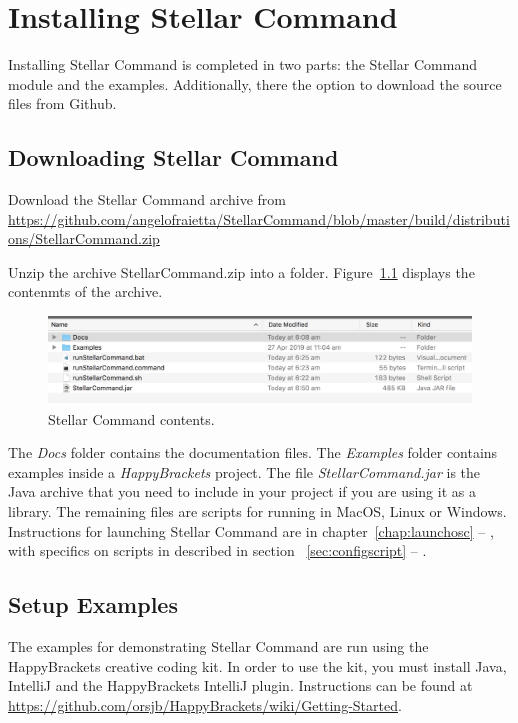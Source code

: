 \chapter{Installing Stellar Command} \label{chap:install}
Installing Stellar Command is completed in two parts: the Stellar Command module and the examples. Additionally, there the option to download the source files from Github.
\section{Downloading Stellar Command}
Download the Stellar Command archive from \url{https://github.com/angelofraietta/StellarCommand/blob/master/build/distributions/StellarCommand.zip}

Unzip the archive StellarCommand.zip into a folder. Figure~\ref{fig:zipcontents} displays the contenmts of the archive. 

\begin{figure}[htbp]
	\centering
	\includegraphics[width=1\columnwidth]{zipcontents}
	\caption{Stellar Command contents.}
	\label{fig:zipcontents}
\end{figure}

The \textit{Docs} folder contains the documentation files. The \textit{Examples} folder contains examples inside a \textit{HappyBrackets} project. The file \textit{StellarCommand.jar} is the Java archive that you need to include in your project if you are using it as a library. The remaining files are scripts for running in MacOS, Linux or Windows. Instructions for launching Stellar Command are in chapter~\ref{chap:launchosc} --
\emph{}, with specifics on scripts in described in section ~\ref{sec:configscript} --
\emph{}.

\section{Setup Examples}\label{subsec:runningexamples} 
The examples for demonstrating Stellar Command are run using the HappyBrackets creative coding kit. In order to use the kit, you must install Java, IntelliJ and the HappyBrackets IntelliJ plugin. Instructions can be found at \url{https://github.com/orsjb/HappyBrackets/wiki/Getting-Started}.


